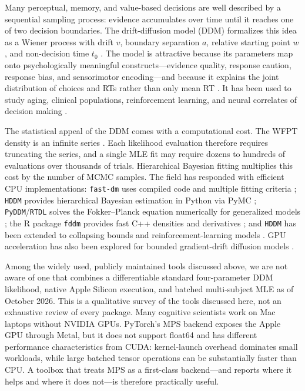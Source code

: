 \documentclass[11pt]{article}
\begin{document}
Many perceptual, memory, and value-based decisions are well described by a sequential sampling process: evidence accumulates over time until it reaches one of two decision boundaries. The drift-diffusion model (DDM) formalizes this idea as a Wiener process with drift $v$, boundary separation $a$, relative starting point $w$, and non-decision time $t_0$ \citep{Ratcliff1978,RatcliffMcKoon2008}. The model is attractive because its parameters map onto psychologically meaningful constructs---evidence quality, response caution, response bias, and sensorimotor encoding---and because it explains the joint distribution of choices and RTs rather than only mean RT \citep{RatcliffSmith2004,Forstmann2016}. It has been used to study aging, clinical populations, reinforcement learning, and neural correlates of decision making \citep{Ratcliff2016,Myers2022}.

The statistical appeal of the DDM comes with a computational cost. The WFPT density is an infinite series \citep{Feller1968,NavarroFuss2009}. Each likelihood evaluation therefore requires truncating the series, and a single MLE fit may require dozens to hundreds of evaluations over thousands of trials. Hierarchical Bayesian fitting multiplies this cost by the number of MCMC samples. The field has responded with efficient CPU implementations: \texttt{fast-dm} uses compiled code and multiple fitting criteria \citep{Voss2015}; \texttt{HDDM} provides hierarchical Bayesian estimation in Python via PyMC \citep{Wiecki2013}; \texttt{PyDDM}/\texttt{RTDL} solves the Fokker--Planck equation numerically for generalized models \citep{Shinn2020}; the R package \texttt{fddm} provides fast C++ densities and derivatives \citep{FosterSingmann2024}; and \texttt{HDDM} has been extended to collapsing bounds and reinforcement-learning models \citep{Fengler2022}. GPU acceleration has also been explored for bounded gradient-drift diffusion models \citep{Loossens2022}.

Among the widely used, publicly maintained tools discussed above, we are not aware of one that combines a differentiable standard four-parameter DDM likelihood, native Apple Silicon execution, and batched multi-subject MLE as of October 2026. This is a qualitative survey of the tools discussed here, not an exhaustive review of every package. Many cognitive scientists work on Mac laptops without NVIDIA GPUs. PyTorch's MPS backend exposes the Apple GPU through Metal, but it does not support float64 and has different performance characteristics from CUDA: kernel-launch overhead dominates small workloads, while large batched tensor operations can be substantially faster than CPU. A toolbox that treats MPS as a first-class backend---and reports where it helps and where it does not---is therefore practically useful.
\end{document}
